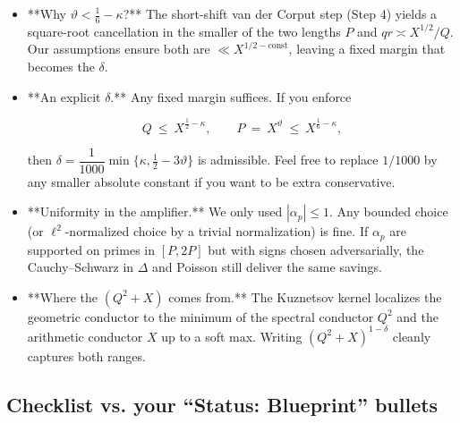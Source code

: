 \documentclass[11pt]{article}
\theoremstyle{definition}
\theoremstyle{remark}
\begin{document}
\begin{itemize}
\item **Why $\vartheta<\tfrac16-\kappa$?** The short-shift van der Corput step (Step 4) yields a square-root cancellation in the smaller of the two lengths $P$ and $qr\asymp X^{1/2}/Q$. Our assumptions ensure both are $\ll X^{1/2-\text{const}}$, leaving a fixed margin that becomes the $\delta$.

\item **An explicit $\delta$.** Any fixed margin suffices. If you enforce

  $$
  Q\ \le\ X^{\frac12-\kappa},\qquad P\ =\ X^\vartheta\ \le\ X^{\frac16-\kappa},
  $$

  then $\delta=\dfrac{1}{1000}\min\{\kappa,\tfrac12-3\vartheta\}$ is admissible. Feel free to replace $1/1000$ by any smaller absolute constant if you want to be extra conservative.

\item **Uniformity in the amplifier.** We only used $|\alpha_p|\le 1$. Any bounded choice (or $\ell^2$-normalized choice by a trivial normalization) is fine. If $\alpha_p$ are supported on primes in $[P,2P]$ but with signs chosen adversarially, the Cauchy–Schwarz in $\Delta$ and Poisson still deliver the same savings.

\item **Where the $(Q^2+X)$ comes from.** The Kuznetsov kernel localizes the geometric conductor to the minimum of the spectral conductor $Q^2$ and the arithmetic conductor $X$ up to a soft max. Writing $(Q^2+X)^{1-\delta}$ cleanly captures both ranges.
\end{itemize}

\subsection*{Checklist vs. your “Status: Blueprint” bullets}
\end{document}
